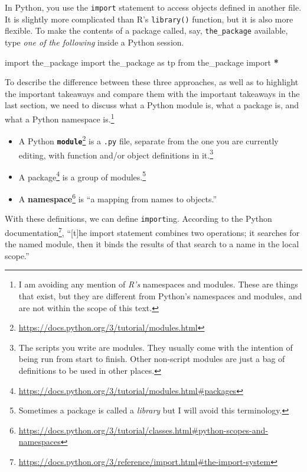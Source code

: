 \documentclass[
  12pt,
  krantz2]{krantz}
\makeatletter
\newenvironment{Shaded}{\begin{snugshade}}{\end{snugshade}}
\newcommand{\ImportTok}[1]{#1}
\newcommand{\NormalTok}[1]{#1}
\newcommand{\OperatorTok}[1]{\textcolor[rgb]{0.43,0.43,0.43}{\textbf{#1}}}
\renewcommand{\href}[2]{#2\footnote{\url{#1}}}
\newenvironment{kframe}{%
\medskip{}
\setlength{\fboxsep}{.8em}
 \def\at@end@of@kframe{}%
 \ifinner\ifhmode%
  \def\at@end@of@kframe{\end{minipage}}%
  \begin{minipage}{\columnwidth}%
 \fi\fi%
 \def\FrameCommand##1{\hskip\@totalleftmargin \hskip-\fboxsep
 \colorbox{shadecolor}{##1}\hskip-\fboxsep
     \hskip-\linewidth \hskip-\@totalleftmargin \hskip\columnwidth}%
 \MakeFramed {\advance\hsize-\width
   \@totalleftmargin\z@ \linewidth\hsize
   \@setminipage}}%
 {\par\unskip\endMakeFramed%
 \at@end@of@kframe}
\renewenvironment{Shaded}{\begin{kframe}}{\end{kframe}}
\makeatother
\begin{document}
In Python, you use the \texttt{import} statement to access objects defined in another file. It is slightly more complicated than R's \texttt{library()} function, but it is also more flexible. To make the contents of a package called, say, \texttt{the\_package} available, type \emph{one of the following} inside a Python session.

\begin{Shaded}
\begin{Highlighting}[]
\ImportTok{import}\NormalTok{ the\_package}
\ImportTok{import}\NormalTok{ the\_package }\ImportTok{as}\NormalTok{ tp }
\ImportTok{from}\NormalTok{ the\_package }\ImportTok{import} \OperatorTok{*}
\end{Highlighting}
\end{Shaded}

To describe the difference between these three approaches, as well as to highlight the important takeaways and compare them with the important takeaways in the last section, we need to discuss what a Python module is, what a package is, and what a Python namespace is.\footnote{I am avoiding any mention of \emph{R's} namespaces and modules. These are things that exist, but they are different from Python's namespaces and modules, and are not within the scope of this text.}

\begin{itemize}
\item
  A Python \href{https://docs.python.org/3/tutorial/modules.html}{\textbf{\texttt{module}}} is a \texttt{.py} file, separate from the one you are currently editing, with function and/or object definitions in it.\footnote{The scripts you write are modules. They usually come with the intention of being run from start to finish. Other non-script modules are just a bag of definitions to be used in other places.}
\item
  A \href{https://docs.python.org/3/tutorial/modules.html\#packages}{package} is a group of modules.\footnote{Sometimes a package is called a \emph{library} but I will avoid this terminology.}
\item
  A \href{https://docs.python.org/3/tutorial/classes.html\#python-scopes-and-namespaces}{\textbf{namespace}} is ``a mapping from names to objects.''
\end{itemize}

With these definitions, we can define \texttt{import}ing. According to the \href{https://docs.python.org/3/reference/import.html\#the-import-system}{Python documentation}, ``{[}t{]}he import statement combines two operations; it searches for the named module, then it binds the results of that search to a name in the local scope.''
\end{document}
